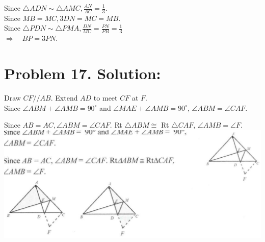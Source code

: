 \documentclass[10pt]{article}
\begin{document}
Since \(\triangle A D N \sim \triangle A M C, \frac{A N}{A C}=\frac{1}{3}\).\\
Since \(M B=M C, 3 D N=M C=M B\).\\
Since \(\triangle P D N \sim \triangle P M A, \frac{D N}{M C}=\frac{P N}{P B}=\frac{1}{3}\)\\
\(\Rightarrow \quad B P=3 P N\).

\section*{Problem 17. Solution:}
Draw \(C F / / A B\). Extend \(A D\) to meet \(C F\) at \(F\).\\
Since \(\angle A B M+\angle A M B=90^{\circ}\) and \(\angle M A E+\angle A M B=90^{\circ}\), \(\angle A B M=\angle C A F\).

Since \(A B=A C, \angle A B M=\angle C A F\). Rt \(\triangle A B M \cong\) Rt \(\triangle C A F\), \(\angle A M B=\angle F\).\\
\includegraphics[max width=\textwidth, center]{2025_04_17_97bc1f7e44d93c271a88g-139(1)}
\end{document}
